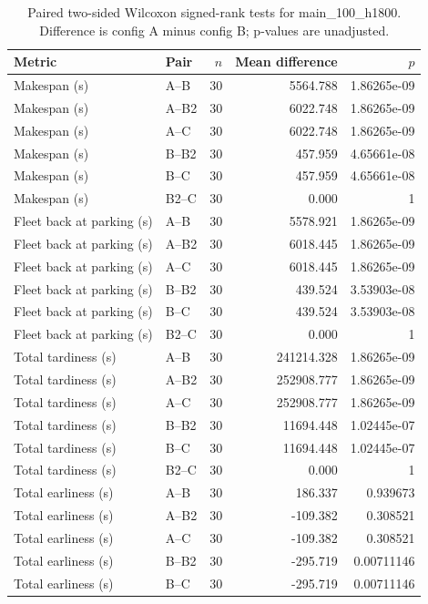 \begin{table}[t]
\centering
\caption{Paired two-sided Wilcoxon signed-rank tests for main\_100\_h1800. Difference is config A minus config B; p-values are unadjusted.}
\label{tab:main-100-h1800-paired}
\begin{tabular}{llrrr}
\toprule
Metric & Pair & $n$ & Mean difference & $p$ \\
\midrule
Makespan (s) & A--B & 30 & 5564.788 & 1.86265e-09 \\
Makespan (s) & A--B2 & 30 & 6022.748 & 1.86265e-09 \\
Makespan (s) & A--C & 30 & 6022.748 & 1.86265e-09 \\
Makespan (s) & B--B2 & 30 & 457.959 & 4.65661e-08 \\
Makespan (s) & B--C & 30 & 457.959 & 4.65661e-08 \\
Makespan (s) & B2--C & 30 & 0.000 & 1 \\
Fleet back at parking (s) & A--B & 30 & 5578.921 & 1.86265e-09 \\
Fleet back at parking (s) & A--B2 & 30 & 6018.445 & 1.86265e-09 \\
Fleet back at parking (s) & A--C & 30 & 6018.445 & 1.86265e-09 \\
Fleet back at parking (s) & B--B2 & 30 & 439.524 & 3.53903e-08 \\
Fleet back at parking (s) & B--C & 30 & 439.524 & 3.53903e-08 \\
Fleet back at parking (s) & B2--C & 30 & 0.000 & 1 \\
Total tardiness (s) & A--B & 30 & 241214.328 & 1.86265e-09 \\
Total tardiness (s) & A--B2 & 30 & 252908.777 & 1.86265e-09 \\
Total tardiness (s) & A--C & 30 & 252908.777 & 1.86265e-09 \\
Total tardiness (s) & B--B2 & 30 & 11694.448 & 1.02445e-07 \\
Total tardiness (s) & B--C & 30 & 11694.448 & 1.02445e-07 \\
Total tardiness (s) & B2--C & 30 & 0.000 & 1 \\
Total earliness (s) & A--B & 30 & 186.337 & 0.939673 \\
Total earliness (s) & A--B2 & 30 & -109.382 & 0.308521 \\
Total earliness (s) & A--C & 30 & -109.382 & 0.308521 \\
Total earliness (s) & B--B2 & 30 & -295.719 & 0.00711146 \\
Total earliness (s) & B--C & 30 & -295.719 & 0.00711146 \\

\end{tabular}
\end{table}
